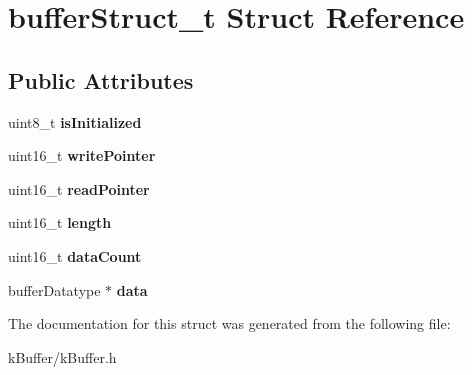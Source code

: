 \hypertarget{structbuffer_struct__t}{}\section{buffer\+Struct\+\_\+t Struct Reference}
\label{structbuffer_struct__t}
\subsection*{Public Attributes}
\begin{DoxyCompactItemize}
\item 
\hypertarget{structbuffer_struct__t_a98d4ee24d5ed452337e6ffef8987f4d7}{}uint8\+\_\+t {\bfseries is\+Initialized}\label{structbuffer_struct__t_a98d4ee24d5ed452337e6ffef8987f4d7}

\item 
\hypertarget{structbuffer_struct__t_a6b4c9d0e3162b260b4114062024cff2e}{}uint16\+\_\+t {\bfseries write\+Pointer}\label{structbuffer_struct__t_a6b4c9d0e3162b260b4114062024cff2e}

\item 
\hypertarget{structbuffer_struct__t_afe0bd6b59076bc215827da252927b465}{}uint16\+\_\+t {\bfseries read\+Pointer}\label{structbuffer_struct__t_afe0bd6b59076bc215827da252927b465}

\item 
\hypertarget{structbuffer_struct__t_a2b59d6bf31f0c8ff46c7b3a5b59cdc82}{}uint16\+\_\+t {\bfseries length}\label{structbuffer_struct__t_a2b59d6bf31f0c8ff46c7b3a5b59cdc82}

\item 
\hypertarget{structbuffer_struct__t_a169720b402736b835e37c6d935dd6faa}{}uint16\+\_\+t {\bfseries data\+Count}\label{structbuffer_struct__t_a169720b402736b835e37c6d935dd6faa}

\item 
\hypertarget{structbuffer_struct__t_aa9bd0d95e547b538572a46b2180520ac}{}buffer\+Datatype $\ast$ {\bfseries data}\label{structbuffer_struct__t_aa9bd0d95e547b538572a46b2180520ac}

\end{DoxyCompactItemize}


The documentation for this struct was generated from the following file\+:\begin{DoxyCompactItemize}
\item 
k\+Buffer/k\+Buffer.\+h\end{DoxyCompactItemize}
